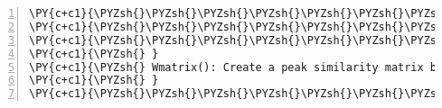 \begin{Verbatim}[commandchars=\\\{\},codes={\catcode`\$=3\catcode`\^=7\catcode`\_=8},gobble=0,numbers=left,fontfamily=fvm,fontshape=n,fontsize=\footnotesize,tabsize=2]
\PY{c+c1}{\PYZsh{}\PYZsh{}\PYZsh{}\PYZsh{}\PYZsh{}\PYZsh{}\PYZsh{}\PYZsh{}\PYZsh{}\PYZsh{}\PYZsh{}\PYZsh{}\PYZsh{}\PYZsh{}\PYZsh{}\PYZsh{}\PYZsh{}\PYZsh{}\PYZsh{}\PYZsh{}\PYZsh{}\PYZsh{}\PYZsh{}\PYZsh{}\PYZsh{}\PYZsh{}\PYZsh{}\PYZsh{}\PYZsh{}\PYZsh{}\PYZsh{}\PYZsh{}\PYZsh{}\PYZsh{}\PYZsh{}\PYZsh{}\PYZsh{}\PYZsh{}\PYZsh{}\PYZsh{}\PYZsh{}\PYZsh{}\PYZsh{}\PYZsh{}\PYZsh{}\PYZsh{}\PYZsh{}\PYZsh{}\PYZsh{}\PYZsh{}\PYZsh{}\PYZsh{}\PYZsh{}\PYZsh{}\PYZsh{}\PYZsh{}\PYZsh{}\PYZsh{}\PYZsh{}\PYZsh{}\PYZsh{}\PYZsh{}\PYZsh{}\PYZsh{}\PYZsh{}\PYZsh{}\PYZsh{}\PYZsh{}\PYZsh{}\PYZsh{}\PYZsh{}\PYZsh{}\PYZsh{}\PYZsh{}\PYZsh{}\PYZsh{}\PYZsh{}\PYZsh{}\PYZsh{}}
\PY{c+c1}{\PYZsh{}\PYZsh{}\PYZsh{}\PYZsh{}\PYZsh{}\PYZsh{}\PYZsh{}\PYZsh{}\PYZsh{}\PYZsh{}\PYZsh{}\PYZsh{}\PYZsh{}\PYZsh{}\PYZsh{}\PYZsh{}\PYZsh{}\PYZsh{}\PYZsh{}\PYZsh{}\PYZsh{}\PYZsh{}\PYZsh{}\PYZsh{}\PYZsh{}\PYZsh{}\PYZsh{}\PYZsh{}\PYZsh{}\PYZsh{}\PYZsh{}\PYZsh{}\PYZsh{}\PYZsh{}\PYZsh{}\PYZsh{}\PYZsh{} Function \PYZsh{}\PYZsh{}\PYZsh{}\PYZsh{}\PYZsh{}\PYZsh{}\PYZsh{}\PYZsh{}\PYZsh{}\PYZsh{}\PYZsh{}\PYZsh{}\PYZsh{}\PYZsh{}\PYZsh{}\PYZsh{}\PYZsh{}\PYZsh{}\PYZsh{}\PYZsh{}\PYZsh{}\PYZsh{}\PYZsh{}\PYZsh{}\PYZsh{}\PYZsh{}\PYZsh{}\PYZsh{}\PYZsh{}\PYZsh{}\PYZsh{}\PYZsh{}}
\PY{c+c1}{\PYZsh{}\PYZsh{}\PYZsh{}\PYZsh{}\PYZsh{}\PYZsh{}\PYZsh{}\PYZsh{}\PYZsh{}\PYZsh{}\PYZsh{}\PYZsh{}\PYZsh{}\PYZsh{}\PYZsh{}\PYZsh{}\PYZsh{}\PYZsh{}\PYZsh{}\PYZsh{}\PYZsh{}\PYZsh{}\PYZsh{}\PYZsh{}\PYZsh{}\PYZsh{}\PYZsh{}\PYZsh{}\PYZsh{}\PYZsh{}\PYZsh{}\PYZsh{}\PYZsh{}\PYZsh{}\PYZsh{}\PYZsh{}\PYZsh{}\PYZsh{}\PYZsh{}\PYZsh{}\PYZsh{}\PYZsh{}\PYZsh{}\PYZsh{}\PYZsh{}\PYZsh{}\PYZsh{}\PYZsh{}\PYZsh{}\PYZsh{}\PYZsh{}\PYZsh{}\PYZsh{}\PYZsh{}\PYZsh{}\PYZsh{}\PYZsh{}\PYZsh{}\PYZsh{}\PYZsh{}\PYZsh{}\PYZsh{}\PYZsh{}\PYZsh{}\PYZsh{}\PYZsh{}\PYZsh{}\PYZsh{}\PYZsh{}\PYZsh{}\PYZsh{}\PYZsh{}\PYZsh{}\PYZsh{}\PYZsh{}\PYZsh{}\PYZsh{}\PYZsh{}\PYZsh{}}
\PY{c+c1}{\PYZsh{} }
\PY{c+c1}{\PYZsh{} Wmatrix(): Create a peak similarity matrix between an N\PYZhy{} and M\PYZhy{}alignment}
\PY{c+c1}{\PYZsh{} }
\PY{c+c1}{\PYZsh{}\PYZsh{}\PYZsh{}\PYZsh{}\PYZsh{}\PYZsh{}\PYZsh{}\PYZsh{}\PYZsh{}\PYZsh{}\PYZsh{}\PYZsh{}\PYZsh{}\PYZsh{}\PYZsh{}\PYZsh{}\PYZsh{}\PYZsh{}\PYZsh{}\PYZsh{}\PYZsh{}\PYZsh{}\PYZsh{}\PYZsh{}\PYZsh{}\PYZsh{}\PYZsh{}\PYZsh{}\PYZsh{}\PYZsh{}\PYZsh{}\PYZsh{}\PYZsh{}\PYZsh{}\PYZsh{}\PYZsh{}\PYZsh{}\PYZsh{}\PYZsh{}\PYZsh{}\PYZsh{}\PYZsh{}\PYZsh{}\PYZsh{}\PYZsh{}\PYZsh{}\PYZsh{}\PYZsh{}\PYZsh{}\PYZsh{}\PYZsh{}\PYZsh{}\PYZsh{}\PYZsh{}\PYZsh{}\PYZsh{}\PYZsh{}\PYZsh{}\PYZsh{}\PYZsh{}\PYZsh{}\PYZsh{}\PYZsh{}\PYZsh{}\PYZsh{}\PYZsh{}\PYZsh{}\PYZsh{}\PYZsh{}\PYZsh{}\PYZsh{}\PYZsh{}\PYZsh{}\PYZsh{}\PYZsh{}\PYZsh{}\PYZsh{}\PYZsh{}\PYZsh{}}

\end{Verbatim}
